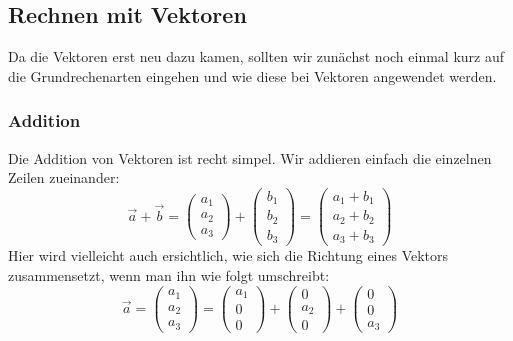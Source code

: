 \subsection{Rechnen mit Vektoren}
	Da die Vektoren erst neu dazu kamen, sollten wir zunächst noch einmal kurz auf
	die Grundrechenarten eingehen und wie diese bei Vektoren angewendet werden.

	\subsubsection{Addition}
		Die Addition von Vektoren ist recht simpel. Wir addieren einfach die einzelnen
		Zeilen zueinander:
		\[\vec{a}+\vec{b}=
		\begin{pmatrix}
		 a_1\\
		 a_2\\
		 a_3
		\end{pmatrix}+\begin{pmatrix}
		 b_1\\
		 b_2\\
		 b_3
		\end{pmatrix}
		=
		\begin{pmatrix}
		 a_1+b_1\\
		 a_2+b_2\\
		 a_3+b_3
		\end{pmatrix} \]
		Hier wird vielleicht auch ersichtlich, wie sich die Richtung eines Vektors
		zusammensetzt, wenn man ihn wie folgt umschreibt:
		\[\vec{a}=
		\begin{pmatrix}
		 a_1\\
		 a_2\\
		 a_3
		\end{pmatrix}=
		\begin{pmatrix}
		 a_1\\
		 0\\
		 0
		\end{pmatrix} +
		\begin{pmatrix}
		 0\\
		 a_2\\
		 0
		\end{pmatrix} +
		\begin{pmatrix}
		 0\\
		 0\\
		 a_3
		\end{pmatrix}
		\]

